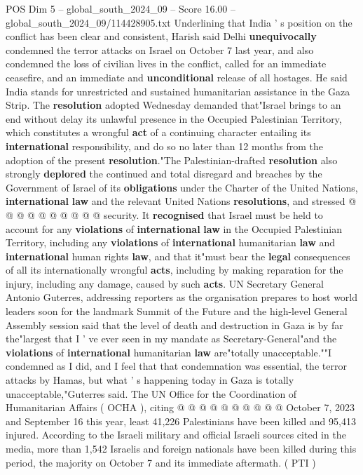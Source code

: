 \begin{textsample}{POS Dim 5 – global\_south\_2024\_09 – Score 16.00 – global\_south\_2024\_09/114428905.txt}
Underlining that India ' s position on the conflict has been clear and consistent, Harish said Delhi \textbf{unequivocally} condemned the terror attacks on Israel on October 7 last year, and also condemned the loss of civilian lives in the conflict, called for an immediate ceasefire, and an immediate and \textbf{unconditional} release of all hostages.
He said India stands for unrestricted and sustained humanitarian assistance in the Gaza Strip.
The \textbf{resolution} adopted Wednesday demanded that"Israel brings to an end without delay its unlawful presence in the Occupied Palestinian Territory, which constitutes a wrongful \textbf{act} of a continuing character entailing its \textbf{international} responsibility, and do so no later than 12 months from the adoption of the present \textbf{resolution}."The Palestinian-drafted \textbf{resolution} also strongly \textbf{deplored} the continued and total disregard and breaches by the Government of Israel of its \textbf{obligations} under the Charter of the United Nations, \textbf{international} \textbf{law} and the relevant United Nations \textbf{resolutions}, and stressed @ @ @ @ @ @ @ @ @ @ security.
It \textbf{recognised} that Israel must be held to account for any \textbf{violations} of \textbf{international} \textbf{law} in the Occupied Palestinian Territory, including any \textbf{violations} of \textbf{international} humanitarian \textbf{law} and \textbf{international} human rights \textbf{law}, and that it"must bear the \textbf{legal} consequences of all its internationally wrongful \textbf{acts}, including by making reparation for the injury, including any damage, caused by such \textbf{acts}.
UN Secretary General Antonio Guterres, addressing reporters as the organisation prepares to host world leaders soon for the landmark Summit of the Future and the high-level General Assembly session said that the level of death and destruction in Gaza is by far the"largest that I ' ve ever seen in my mandate as Secretary-General"and the \textbf{violations} of \textbf{international} humanitarian \textbf{law} are"totally unacceptable.""I condemned as I did, and I feel that that condemnation was essential, the terror attacks by Hamas, but what ' s happening today in Gaza is totally unacceptable,"Guterres said.
The UN Office for the Coordination of Humanitarian Affairs ( OCHA ), citing @ @ @ @ @ @ @ @ @ @ October 7, 2023 and September 16 this year, least 41,226 Palestinians have been killed and 95,413 injured.
According to the Israeli military and official Israeli sources cited in the media, more than 1,542 Israelis and foreign nationals have been killed during this period, the majority on October 7 and its immediate aftermath. ( PTI )

\end{textsample}
